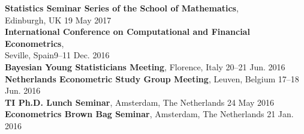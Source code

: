 \documentclass[margin,line]{resume}
\begin{document}
\begin{resume}
    \textbf{Statistics Seminar Series of the School of Mathematics},\\ Edinburgh, UK \hfill 19 May 2017 \vspace{1mm} \\ 
    \textbf{ International Conference on Computational and Financial Econometrics},\\ Seville, Spain\hfill 9--11 Dec. 2016\\ 
	\textbf{ Bayesian Young Statisticians Meeting}, Florence, Italy \hfill 20--21 Jun. 2016\\ 
    \textbf{ Netherlands Econometric Study Group Meeting}, Leuven, Belgium \hfill 17--18 Jun. 2016\\ 
     \textbf{TI Ph.D. Lunch Seminar}, Amsterdam, The Netherlands \hfill 24 May 2016\\ 
	\textbf{Econometrics Brown Bag Seminar}, Amsterdam, The Netherlands \hfill 21 Jan. 2016\\ 

\vspace{-3mm}


 

\end{resume}
\end{document}
